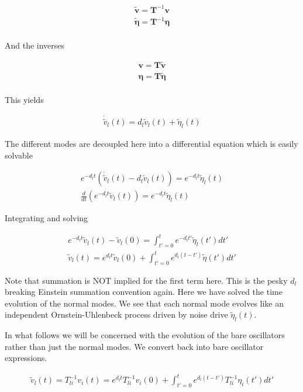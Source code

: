 \documentclass[12pt]{article}
\newcommand{\bv}[1]{\boldsymbol{#1}}
\begin{document}
\begin{align}
\tilde{\bv{v}} = \bv{T}^{-1}\bv{v}\\
\tilde{\bv{\eta}} = \bv{T}^{-1}\bv{\eta}\\
\end{align}

And the inverses

\begin{align}
\bv{v} = \bv{T}\tilde{\bv{v}}\\
\bv{\eta} = \bv{T}\tilde{\bv{\eta}}\\
\end{align}

This yields

\begin{align}
\dot{\tilde{v}}_l(t) = d_l \tilde{v}_l(t) + \tilde{\eta}_l(t)
\end{align}

The different modes are decoupled here into a differential equation which is easily solvable

\begin{align}
e^{-d_l t}\left(\dot{\tilde{v}}_l(t) - d_l \tilde{v}_l(t)\right) = e^{-d_lt}\tilde{\eta}_l(t)\\
\frac{d}{dt}\left(e^{-d_l t} \tilde{v}_l(t)\right) = e^{-d_l t}\tilde{\eta}_l(t)
\end{align}

Integrating and solving

\begin{align}
e^{-d_l t} \tilde{v}_l(t) - \tilde{v}_l(0) = \int_{t'=0}^{t}e^{-d_l t'}\tilde{\eta}_l(t')dt'\\
\tilde{v}_l(t) = e^{d_l t}\tilde{v}_l(0) + \int_{t'=0}^{t} e^{d_l (t-t')} \tilde{\eta}(t')dt'
\end{align}

Note that summation is NOT implied for the first term here. This is the pesky $d_l$ breaking Einstein summation convention again. Here we have solved the time evolution of the normal modes. We see that each normal mode evolves like an independent Ornstein-Uhlenbeck process driven by noise drive $\tilde{\eta}_l(t)$.

In what follows we will be concerned with the evolution of the bare oscillators rather than just the normal modes. We convert back into bare oscillator expressions.

\begin{align}
\tilde{v}_l(t) = T^{-1}_{li}v_i(t) = e^{d_l t}T^{-1}_{li}v_i(0) + \int_{t'=0}^{t}e^{d_l(t-t')}T^{-1}_{li}\eta_i(t')dt'
\end{align}
\end{document}
